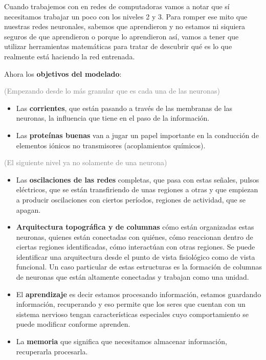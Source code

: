 Cuando trabajemos con en redes de computadoras vamos a notar que sí necesitamos trabajar un poco con los niveles 2 y 3. Para romper ese mito que nuestras redes neuronales, sabemos que aprendieron y no estamos ni siquiera seguros de que aprendieron o porque lo aprendieron así, vamos a tener que utilizar herramientas matemáticas para tratar de descubrir qué es lo que realmente está haciendo la red entrenada. 


Ahora los \textbf{objetivos del modelado}:

\textcolor{gray}{(Empezando desde lo más granular que es cada una de las neuronas)}

\begin{itemize}
 \item Las \textbf{corrientes}, que están pasando a través de las membranas de las neuronas, la influencia que tiene en el paso de la información. 
 \item Las \textbf{proteínas buenas} van a jugar un papel importante en la conducción de elementos iónicos no transmisores (acoplamientos químicos).
\end{itemize}

\textcolor{gray}{(El siguiente nivel ya no solamente de una neurona)}

\begin{itemize}
 \item Las \textbf{oscilaciones de las redes} completas, que pasa con estas señales, pulsos eléctricos, que se están transfiriendo de unas regiones a otras y que empiezan a producir oscilaciones con ciertos períodos,  regiones de actividad, que se apagan.
 \item \textbf{Arquitectura topográfica y de columnas} cómo están organizadas estas neuronas, quienes están conectadas con quiénes, cómo reaccionan dentro de ciertas regiones identificadas, cómo interactúan con otras regiones. Se puede identificar una arquitectura desde el punto de vista fisiológico como de vista funcional. Un caso particular de estas estructuras es la formación de columnas de neuronas que están altamente conectadas y trabajan como una unidad.
 \item El \textbf{aprendizaje} es decir estamos procesando información, estamos guardando información, recuperando y eso permite que los seres que cuentan con un sistema nervioso tengan características especiales cuyo comportamiento se puede modificar conforme aprenden. 
 \item La \textbf{memoria} que significa que necesitamos almacenar información, recuperarla procesarla. 
\end{itemize}


